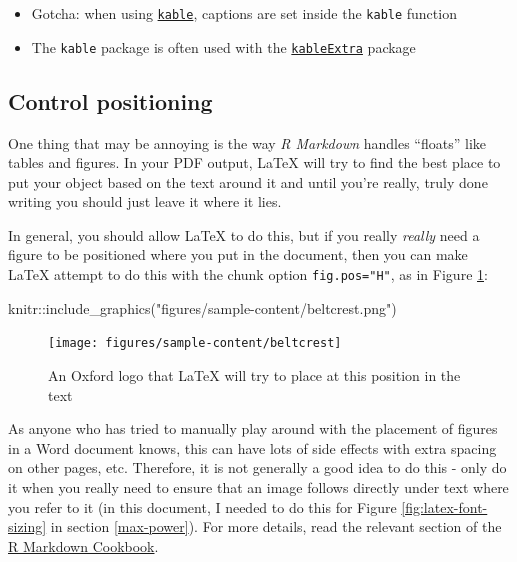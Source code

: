 \documentclass[a4paper, nobind]{templates/ociamthesis}
\providecommand{\tightlist}{%
  \setlength{\itemsep}{0pt}\setlength{\parskip}{0pt}}
\newenvironment{Shaded}{\begin{snugshade}}{\end{snugshade}}
\newcommand{\FunctionTok}[1]{\textcolor[rgb]{0.00,0.00,0.00}{#1}}
\newcommand{\NormalTok}[1]{#1}
\newcommand{\SpecialCharTok}[1]{\textcolor[rgb]{0.00,0.00,0.00}{#1}}
\newcommand{\StringTok}[1]{\textcolor[rgb]{0.31,0.60,0.02}{#1}}
\renewenvironment{Shaded}
{
  \vspace{10pt}%
  \begin{snugshade}%
}{%
  \end{snugshade}%
  \vspace{8pt}%
}
\begin{document}
\begin{itemize}
\tightlist
\item
  Gotcha: when using \href{https://www.rdocumentation.org/packages/knitr/versions/1.21/topics/kable}{\texttt{kable}}, captions are set inside the \texttt{kable} function
\item
  The \texttt{kable} package is often used with the \href{https://cran.r-project.org/web/packages/kableExtra/vignettes/awesome_table_in_html.html}{\texttt{kableExtra}} package
\end{itemize}

\hypertarget{control-positioning}{%
\subsection{Control positioning}\label{control-positioning}}

One thing that may be annoying is the way \emph{R Markdown} handles ``floats'' like tables and figures.
In your PDF output, LaTeX will try to find the best place to put your object based on the text around it and until you're really, truly done writing you should just leave it where it lies.

In general, you should allow LaTeX to do this, but if you really \emph{really} need a figure to be positioned where you put in the document, then you can make LaTeX attempt to do this with the chunk option \texttt{fig.pos="H"}, as in Figure \ref{fig:oxford-logo-controlled}:

\begin{Shaded}
\begin{Highlighting}[]
\NormalTok{knitr}\SpecialCharTok{::}\FunctionTok{include\_graphics}\NormalTok{(}\StringTok{"figures/sample{-}content/beltcrest.png"}\NormalTok{)}
\end{Highlighting}
\end{Shaded}

\begin{figure}[H]

{\centering \texttt{[image: figures/sample-content/beltcrest]} 

}

\caption{An Oxford logo that LaTeX will try to place at this position in the text}\label{fig:oxford-logo-controlled}
\end{figure}

As anyone who has tried to manually play around with the placement of figures in a Word document knows, this can have lots of side effects with extra spacing on other pages, etc.
Therefore, it is not generally a good idea to do this - only do it when you really need to ensure that an image follows directly under text where you refer to it (in this document, I needed to do this for Figure \ref{fig:latex-font-sizing} in section \ref{max-power}).
For more details, read the relevant section of the \href{https://bookdown.org/yihui/rmarkdown-cookbook/figure-placement.html}{R Markdown Cookbook}.
\end{document}
